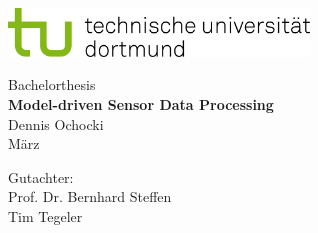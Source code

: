 \begin{titlepage}
\vspace*{-2cm}
\newlength{\links}
\setlength{\links}{-1.5cm}
\sffamily
\hspace*{\links}
\begin{minipage}{12.5cm}
\includegraphics[width=8cm]{bilder/tud_logo_rgb}
\end{minipage}

\vspace*{4cm}

\hspace*{\links}
\hspace*{-0.2cm}
\begin{minipage}{9cm}
\large
\begin{center}
{\Large Bachelorthesis} \\
\vspace*{1cm}
\textbf{Model-driven Sensor Data Processing} \\
\vspace*{1cm}
Dennis Ochocki\\
März
\end{center}
\end{minipage}
\normalsize
\vspace*{5.5cm}


\vspace*{2.1cm}

\hspace*{\links}
\begin{minipage}[b]{5cm}
\raggedright
Gutachter: \\
Prof. Dr. Bernhard Steffen \\
Tim Tegeler \\
\end{minipage}


\end{titlepage}

